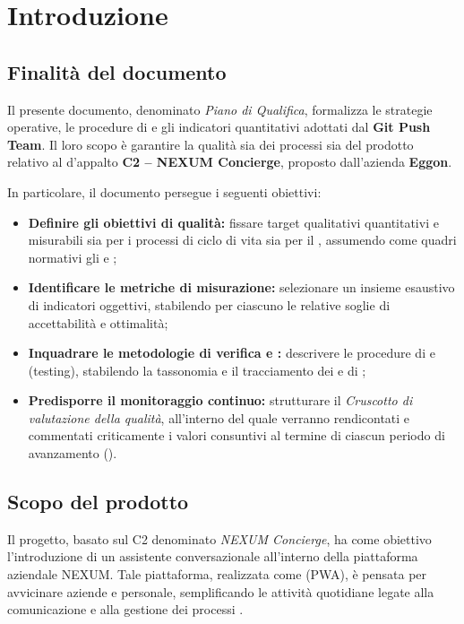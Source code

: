 \documentclass[documento]{gpt}
\begin{document}
\section{Introduzione}

\subsection{Finalità del documento}
Il presente documento, denominato \textit{Piano di Qualifica}, formalizza le strategie operative, le procedure di  e gli indicatori quantitativi adottati dal \textbf{Git Push Team}. Il loro scopo è garantire la qualità sia dei processi sia del prodotto  relativo al  d'appalto \textbf{C2 -- NEXUM Concierge}, proposto dall'azienda \textbf{Eggon}.

In particolare, il documento persegue i seguenti obiettivi:
\begin{itemize}
    \item \textbf{Definire gli obiettivi di qualità:} fissare target qualitativi quantitativi e misurabili sia per i processi di ciclo di vita sia per il , assumendo come quadri normativi gli   e ;
    \item \textbf{Identificare le metriche di misurazione:} selezionare un insieme esaustivo di indicatori oggettivi, stabilendo per ciascuno le relative soglie di accettabilità e ottimalità;
    \item \textbf{Inquadrare le metodologie di verifica e :} descrivere le procedure di  e  (testing), stabilendo la tassonomia e il tracciamento dei  e di ;
    \item \textbf{Predisporre il monitoraggio continuo:} strutturare il \textit{Cruscotto di valutazione della qualità}, all'interno del quale verranno rendicontati e commentati criticamente i valori consuntivi al termine di ciascun periodo di avanzamento ().
\end{itemize}

\subsection{Scopo del prodotto}
Il progetto, basato sul  C2 denominato \textit{NEXUM Concierge}, ha come obiettivo l'introduzione di un assistente conversazionale all'interno della piattaforma aziendale NEXUM. Tale piattaforma, realizzata come  (PWA), è pensata per avvicinare aziende e personale, semplificando le attività quotidiane legate alla comunicazione e alla gestione dei processi .
\end{document}
